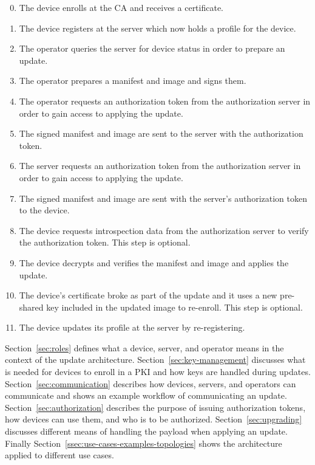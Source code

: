 \documentclass[0-thesis.tex]{subfiles}
\begin{document}
\begin{enumerate}
    \setcounter{enumi}{-1}
    \item The device enrolls at the CA and receives a certificate.
    \item The device registers at the server which now holds a profile for the device.
    \item The operator queries the server for device status in order to prepare an update.
    \item The operator prepares a manifest and image and signs them.
    \item The operator requests an authorization token from the authorization server in
            order to gain access to applying the update.
    \item The signed manifest and image are sent to the server with the authorization
            token.
    \item The server requests an authorization token from the authorization server in
            order to gain access to applying the update.
    \item The signed manifest and image are sent with the server's authorization token to
            the device.
    \item The device requests introspection data from the authorization server
            to verify the authorization token. This step is optional.
    \item The device decrypts and verifies the manifest and image and applies the update.
    \item The device's certificate broke as part of the update and it uses a new
            pre-shared key included in the updated image to re-enroll. This step is
            optional.
    \item The device updates its profile at the server by re-registering.
\end{enumerate}

Section~\ref{sec:roles} defines what a device, server, and operator means in the context
of the update architecture. Section~\ref{sec:key-management} discusses what is needed for
devices to enroll in a PKI and how keys are handled during updates.
Section~\ref{sec:communication} describes how devices, servers, and operators can
communicate and shows an example workflow of communicating an update.
Section~\ref{sec:authorization} describes the purpose of issuing authorization tokens, how
devices can use them, and who is to be authorized. Section~\ref{sec:upgrading} discusses
different means of handling the payload when applying an update.
Finally Section~\ref{ssec:use-cases-examples-topologies} shows the architecture applied to
different use cases.
\end{document}
